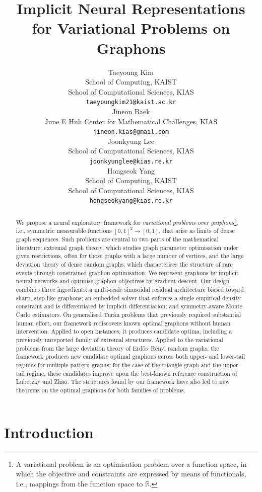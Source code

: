 \documentclass{article}
\title{Implicit Neural Representations \\ for Variational Problems on Graphons}
\author{%
  Taeyoung Kim \\
  School of Computing, KAIST \\
  School of Computational Sciences, KIAS \\
  \texttt{taeyoungkim21@kaist.ac.kr} \\
  \And
  Jineon Baek \\
  June E Huh Center for Mathematical Challenges, KIAS \\
  \texttt{jineon.kias@gmail.com} \\
  \And
  Joonkyung Lee \\
  School of Computational Sciences, KIAS \\
  \texttt{joonkyunglee@kias.re.kr} \\
  \And
  Hongseok Yang \\
  School of Computing, KAIST \\
  School of Computational Sciences, KIAS \\
  \texttt{hongseokyang@kias.re.kr} \\
}
\theoremstyle{plain}
\theoremstyle{definition}
\theoremstyle{remark}
\begin{document}
\maketitle

\allowdisplaybreaks

\begin{abstract}
We propose a neural exploratory framework for \emph{variational problems over graphons}\footnote{A variational problem is an optimisation problem over a function space, in which the objective and constraints are expressed by means of functionals, i.e., mappings from the function space to $\mathbb{R}$.}, i.e., symmetric measurable functions $[0,1]^2 \to [0,1]$, that arise as limits of dense graph sequences. Such problems are central to two parts of the mathematical literature: extremal graph theory, which studies graph parameter optimisation under given restrictions, often for those graphs with a large number of vertices, and the large deviation theory of dense random graphs, which characterises the structure of rare events through constrained graphon optimisation. We represent graphons by implicit neural networks and optimise graphon objectives by gradient descent. Our design combines three ingredients: a multi-scale sinusoidal residual architecture biased toward sharp, step-like graphons; an embedded solver that enforces a single empirical density constraint and is differentiated by implicit differentiation; and symmetry-aware Monte Carlo estimators. On generalised Tur\'an problems that previously required substantial human effort, our framework rediscovers known optimal graphons without human intervention. Applied to open instances, it produces candidate optima, including a previously unreported family of extremal structures. Applied to the variational problems from the large deviation theory of Erd\H{o}s--R\'enyi random graphs, the framework produces new candidate optimal graphons across both upper- and lower-tail regimes for multiple pattern graphs; for the case of the triangle graph and the upper-tail regime, these candidates improve upon the best-known reference construction of Lubetzky and Zhao. The structures found by our framework have also led to new theorems on the optimal graphons for both families of problems.
\end{abstract}


\section{Introduction} \label{sec:introduction}
\end{document}
